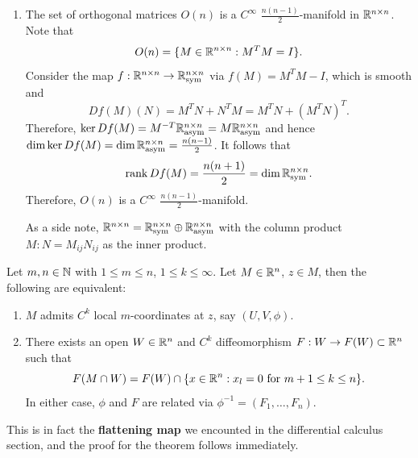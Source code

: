 \documentclass[a4paper]{article}
\begin{document}
\begin{eg}
\begin{enumerate}
\item The set of orthogonal matrices $O(n)$ is a
$C^\infty$ $\frac{n (n - 1)}{2}$-manifold in $\mathbb{R}^{n \times n}$.
Note that
\[
O(n) = \{M \in \mathbb{R}^{n \times n} : M^T M = I\}.
\]
Consider the map $f : \mathbb{R}^{n \times n} \to \mathbb{R}^{n \times n}_{\text{sym}}$
via $f(M) = M^T M - I$, which is smooth and
\[
Df(M)(N) = M^T N + N^T M = M^T N + (M^T N)^T.
\]
Therefore, $\ker Df(M) = M^{-T} \mathbb{R}^{n \times n}_{\text{asym}}
= M \mathbb{R}^{n \times n}_{\text{asym}}$ and hence
$\dim \ker Df(M) = \dim \mathbb{R}^{n \times n}_{\text{asym}}
= \frac{n (n - 1)}{2}$. It follows that
\[
\operatorname{rank} Df(M) = \frac{n (n + 1)}{2} = \dim \mathbb{R}^{n \times n}_{\text{sym}}.
\]
Therefore, $O(n)$ is a $C^\infty$ $\frac{n(n-1)}{2}$-manifold.

As a side note, $\mathbb{R}^{n \times n} = \mathbb{R}^{n \times n}_{\text{sym}}
\oplus \mathbb{R}^{n \times n}_{\text{asym}}$ with the column product
$M : N = M_{ij} N_{ij}$ as the inner product.
\end{enumerate}
\end{eg}

\begin{thm}
Let $m, n \in \mathbb{N}$ with $1 \leq m \leq n$, $1 \leq k \leq \infty$.
Let $M \in \mathbb{R}^n$, $z \in M$, then the following are equivalent:
\begin{enumerate}
\item $M$ admits $C^k$ local $m$-coordinates at $z$,
say $(U, V, \phi)$.

\item There exists an open $W \in \mathbb{R}^n$ and $C^k$ diffeomorphism
$F : W \to F(W) \subset \mathbb{R}^n$ such that
\[
F(M \cap W) = F(W) \cap \{x \in \mathbb{R}^n : x_l = 0 \text{ for
$m + 1 \leq k \leq n$}\}.
\]
In either case, $\phi$ and $F$ are related via
$\phi^{-1} = (F_1, \dots, F_n)$.
\end{enumerate}
\end{thm}

This is in fact the \textbf{flattening map} we encounted in the 
differential calculus section, and the proof for the theorem 
follows immediately.
\end{document}
